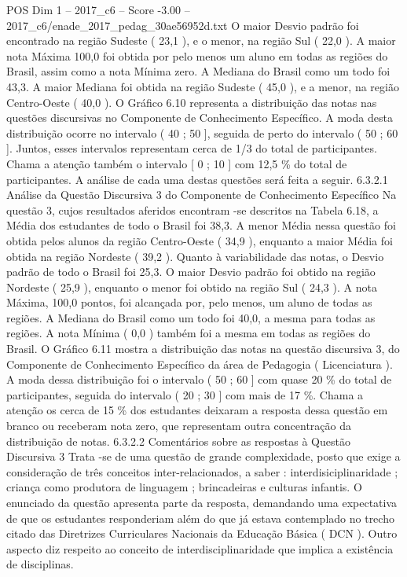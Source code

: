 \begin{textsample}{POS Dim 1 – 2017\_c6 – Score -3.00 – 2017\_c6/enade\_2017\_pedag\_30ae56952d.txt}
O maior Desvio padrão foi encontrado na região Sudeste ( 23,1 ), e o menor, na região Sul ( 22,0 ).
A maior nota Máxima 100,0 foi obtida por pelo menos um aluno em todas as regiões do Brasil, assim como a nota Mínima zero.
A Mediana do Brasil como um todo foi 43,3.
A maior Mediana foi obtida na região Sudeste ( 45,0 ), e a menor, na região Centro-Oeste ( 40,0 ).
O Gráfico 6.10 representa a distribuição das notas nas questões discursivas no Componente de Conhecimento Específico.
A moda desta distribuição ocorre no intervalo ( 40 ; 50 ], seguida de perto do intervalo ( 50 ; 60 ].
Juntos, esses intervalos representam cerca de 1/3 do total de participantes.
Chama a atenção também o intervalo [ 0 ; 10 ] com 12,5 \% do total de participantes.
A análise de cada uma destas questões será feita a seguir. 6.3.2.1 Análise da Questão Discursiva 3 do Componente de Conhecimento Específico Na questão 3, cujos resultados aferidos encontram -se descritos na Tabela 6.18, a Média dos estudantes de todo o Brasil foi 38,3.
A menor Média nessa questão foi obtida pelos alunos da região Centro-Oeste ( 34,9 ), enquanto a maior Média foi obtida na região Nordeste ( 39,2 ).
Quanto à variabilidade das notas, o Desvio padrão de todo o Brasil foi 25,3.
O maior Desvio padrão foi obtido na região Nordeste ( 25,9 ), enquanto o menor foi obtido na região Sul ( 24,3 ).
A nota Máxima, 100,0 pontos, foi alcançada por, pelo menos, um aluno de todas as regiões.
A Mediana do Brasil como um todo foi 40,0, a mesma para todas as regiões.
A nota Mínima ( 0,0 ) também foi a mesma em todas as regiões do Brasil.
O Gráfico 6.11 mostra a distribuição das notas na questão discursiva 3, do Componente de Conhecimento Específico da área de Pedagogia ( Licenciatura ).
A moda dessa distribuição foi o intervalo ( 50 ; 60 ] com quase 20 \% do total de participantes, seguida do intervalo ( 20 ; 30 ] com mais de 17 \%.
Chama a atenção os cerca de 15 \% dos estudantes deixaram a resposta dessa questão em branco ou receberam nota zero, que representam outra concentração da distribuição de notas. 6.3.2.2 Comentários sobre as respostas à Questão Discursiva 3 Trata -se de uma questão de grande complexidade, posto que exige a consideração de três conceitos inter-relacionados, a saber : interdisiciplinaridade ; criança como produtora de linguagem ; brincadeiras e culturas infantis.
O enunciado da questão apresenta parte da resposta, demandando uma expectativa de que os estudantes responderiam além do que já estava contemplado no trecho citado das Diretrizes Curriculares Nacionais da Educação Básica ( DCN ).
Outro aspecto diz respeito ao conceito de interdisciplinaridade que implica a existência de disciplinas.

\end{textsample}
